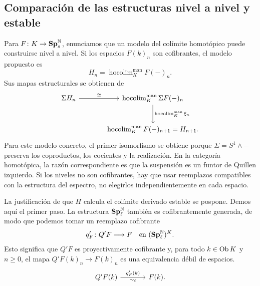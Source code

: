 \subsection{Comparación de las estructuras nivel a nivel y estable}

Para $F\colon K\to\mathbf{Sp}^{\mathbb N}_s$, enunciamos que un modelo del colímite homotópico puede construirse nivel a nivel. Si los espacios $F(k)_n$ son cofibrantes, el modelo propuesto es
\[
H_n=\operatorname{hocolim}^{\mathrm{man}}_K F(-)_n.
\]
Sus mapas estructurales se obtienen de
\[
\begin{tikzcd}[column sep=large,row sep=large]
\Sigma H_n \arrow[r,"\cong"]
& \operatorname{hocolim}^{\mathrm{man}}_K\Sigma F(-)_n
\arrow[d,"\operatorname{hocolim}^{\mathrm{man}}_K\xi_n"]\\
& \operatorname{hocolim}^{\mathrm{man}}_KF(-)_{n+1}=H_{n+1}.
\end{tikzcd}
\]
Para este modelo concreto, el primer isomorfismo se obtiene porque $\Sigma=S^1\wedge-$ preserva los coproductos, los cocientes y la realización. En la categoría homotópica, la razón correspondiente es que la suspensión es un funtor de Quillen izquierdo. Si los niveles no son cofibrantes, hay que usar reemplazos compatibles con la estructura del espectro, no elegirlos independientemente en cada espacio.

La justificación de que $H$ calcula el colímite derivado estable se pospone. Demos aquí el primer paso. La estructura $\mathbf{Sp}^{\mathbb N}_{\ell}$ también es cofibrantemente generada, de modo que podemos tomar un reemplazo cofibrante
\[
q'_F\colon Q'F\longrightarrow F
\quad\text{en }(\mathbf{Sp}^{\mathbb N}_{\ell})^K.
\]
Esto significa que $Q'F$ es proyectivamente cofibrante y, para todo $k\in\operatorname{Ob} K$ y $n\ge0$, el mapa $Q'F(k)_n\to F(k)_n$ es una equivalencia débil de espacios.
\[
\begin{tikzcd}[column sep=large]
Q'F(k) \arrow[r,"q'_F(k)","\sim_\ell"'] & F(k).
\end{tikzcd}
\]

